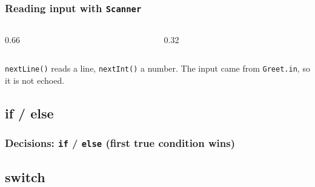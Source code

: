 \documentclass[aspectratio=169,10pt,compress]{beamer}
\begin{document}
\begin{frame}[t,fragile] \frametitle{Reading input with \texttt{Scanner}}
  \begin{columns}[T]
    \begin{column}{0.66\textwidth}
    \end{column}
    \begin{column}{0.32\textwidth}
    \end{column}
  \end{columns}

  \small \texttt{nextLine()} reads a line, \texttt{nextInt()} a number. The input came from \texttt{Greet.in}, so it is not echoed.
\end{frame}


\subsection[if]{if / else}




\begin{frame}[t,fragile] \frametitle{Decisions: \texttt{if} / \texttt{else} (first true condition wins)}
\end{frame}

\subsection[switch]{switch}
\end{document}
